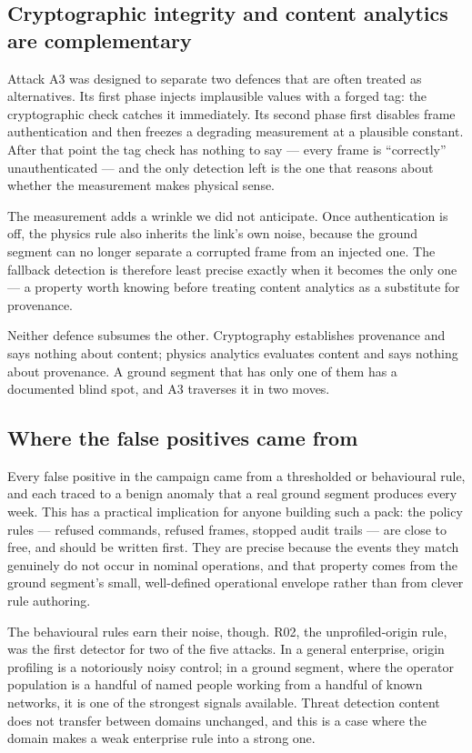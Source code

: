 \subsection{Cryptographic integrity and content analytics are complementary}

Attack A3 was designed to separate two defences that are often treated as
alternatives. Its first phase injects implausible values with a forged tag: the
cryptographic check catches it immediately. Its second phase first disables frame
authentication and then freezes a degrading measurement at a plausible constant.
After that point the tag check has nothing to say --- every frame is
``correctly'' unauthenticated --- and the only detection left is the one that
reasons about whether the measurement makes physical sense.

The measurement adds a wrinkle we did not anticipate. Once authentication is
off, the physics rule also inherits the link's own noise, because the ground
segment can no longer separate a corrupted frame from an injected one. The
fallback detection is therefore least precise exactly when it becomes the only
one --- a property worth knowing before treating content analytics as a
substitute for provenance.

Neither defence subsumes the other. Cryptography establishes provenance and says
nothing about content; physics analytics evaluates content and says nothing about
provenance. A ground segment that has only one of them has a documented blind
spot, and A3 traverses it in two moves.

\subsection{Where the false positives came from}

Every false positive in the campaign came from a thresholded or behavioural rule,
and each traced to a benign anomaly that a real ground segment produces every
week. This has a practical implication for anyone building such a pack: the
policy rules --- refused commands, refused frames, stopped audit trails --- are
close to free, and should be written first. They are precise because the events
they match genuinely do not occur in nominal operations, and that property comes
from the ground segment's small, well-defined operational envelope rather than
from clever rule authoring.

The behavioural rules earn their noise, though. R02, the unprofiled-origin rule,
was the first detector for two of the five attacks. In a general enterprise,
origin profiling is a notoriously noisy control; in a ground segment, where the
operator population is a handful of named people working from a handful of known
networks, it is one of the strongest signals available. Threat detection content
does not transfer between domains unchanged, and this is a case where the domain
makes a weak enterprise rule into a strong one.

